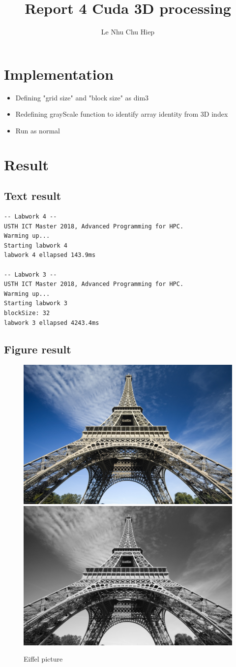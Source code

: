 \documentclass{article}
\title{Report 4 Cuda 3D processing}
\author{Le Nhu Chu Hiep}
\begin{document}
\section{Implementation}
\begin{itemize}
    \item Defining "grid size" and "block size" as dim3
    \item Redefining grayScale function to identify array identity from 3D index
    \item Run as normal
\end{itemize}

\section{Result}
\subsection{Text result}
\begin{verbatim}
-- Labwork 4 --
USTH ICT Master 2018, Advanced Programming for HPC.
Warming up...
Starting labwork 4
labwork 4 ellapsed 143.9ms

-- Labwork 3 --
USTH ICT Master 2018, Advanced Programming for HPC.
Warming up...
Starting labwork 3
blockSize: 32
labwork 3 ellapsed 4243.4ms
\end{verbatim}

\subsection{Figure result}
\begin{figure}
        \includegraphics[width=\textwidth]{./labwork/data/eiffel.jpg}
        \includegraphics[width=\textwidth]{./labwork4-gpu-out.jpg}
        \caption{Eiffel picture}
\end{figure}
\end{document}

